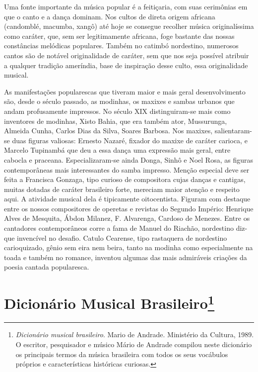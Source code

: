 Uma fonte importante da música popular é a feitiçaria, com suas
cerimônias em que o canto e a dança dominam. Nos cultos de direta origem
africana (candomblé, macumba, xangô) até hoje se consegue recolher
música originalíssima como caráter, que, sem ser legitimamente africana,
foge bastante das nossas constâncias melódicas populares. Também no
catimbó nordestino, numerosos cantos são de notável originalidade de
caráter, sem que nos seja possível atribuir a qualquer tradição
ameríndia, base de inspiração desse culto, essa originalidade musical.

As manifestações popularescas que tiveram maior e mais geral
desenvolvimento são, desde o século passado, as modinhas, os maxixes e
sambas urbanos que andam profusamente impressos. No século XIX
distinguiram-se mais como inventores de modinhas, Xisto Bahia, que era
também ator, Mussurunga, Almeida Cunha, Carlos Dias da Silva, Soares
Barbosa. Nos maxixes, salientaram-se duas figuras valiosas: Ernesto
Nazaré, fixador do maxixe de caráter carioca, e Marcelo Tupinambá que
deu a essa dança uma expressão mais geral, entre cabocla e praceana.
Especializaram-se ainda Donga, Sinhô e Noel Rosa, as figuras
contemporâneas mais interessantes do samba impresso. Menção especial
deve ser feita a Francisca Gonzaga, tipo curioso de compositora cujas
danças e cantigas, muitas dotadas de caráter brasileiro forte, mereciam
maior atenção e respeito aqui. A atividade musical dela é tipicamente
oitocentista. Figuram com destaque entre os nossos compositores de
operetas e revistas do Segundo Império: Henrique Alves de Mesquita,
Ábdon Milanez, F. Alvarenga, Cardoso de Menezes. Entre os cantadores
contemporâneos corre a fama de Manuel do Riachão, nordestino diz-que
invencível no desafio. Catulo Cearense, tipo rastaquera de nordestino
carioquizado, gênio sem eira nem beira, tanto na modinha como
especialmente na toada e também no romance, inventou algumas das mais
admiráveis criações da poesia cantada popularesca.



\chapter{Dicionário Musical Brasileiro\footnote{\emph{Dicionário musical brasileiro}. Mario de Andrade. Ministério da
Cultura, 1989.\\
O escritor, pesquisador e músico Mário de Andrade
compilou neste dicionário os principais termos da música brasileira com
todos os seus vocábulos próprios e características históricas curiosas.}}



